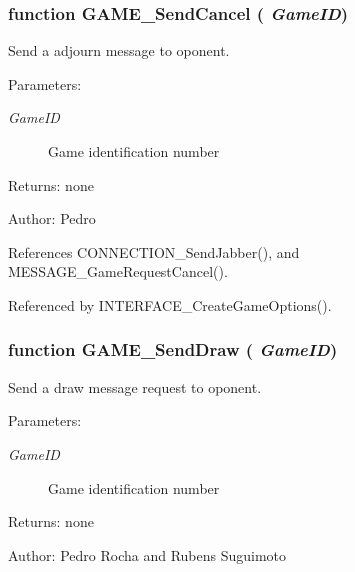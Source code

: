 \subsubsection[GAME\_\-SendCancel]{\setlength{\rightskip}{0pt plus 5cm}function GAME\_\-SendCancel ( {\em GameID})}\label{game_2game_8js_bdbd4cd12806cbf1ac6a2af8c54c9c6e}


Send a adjourn message to oponent. 

\begin{Desc}
\item[Parameters:]
\begin{description}
\item[{\em GameID}]Game identification number \end{description}
\end{Desc}
\begin{Desc}
\item[Returns:]none \end{Desc}
\begin{Desc}
\item[Author:]Pedro \end{Desc}


References CONNECTION\_\-SendJabber(), and MESSAGE\_\-GameRequestCancel().

Referenced by INTERFACE\_\-CreateGameOptions().
\subsubsection[GAME\_\-SendDraw]{\setlength{\rightskip}{0pt plus 5cm}function GAME\_\-SendDraw ( {\em GameID})}\label{game_2game_8js_7539e1d3e3935f44f0ef08cdf7f2956d}


Send a draw message request to oponent. 

\begin{Desc}
\item[Parameters:]
\begin{description}
\item[{\em GameID}]Game identification number \end{description}
\end{Desc}
\begin{Desc}
\item[Returns:]none \end{Desc}
\begin{Desc}
\item[Author:]Pedro Rocha and Rubens Suguimoto \end{Desc}


